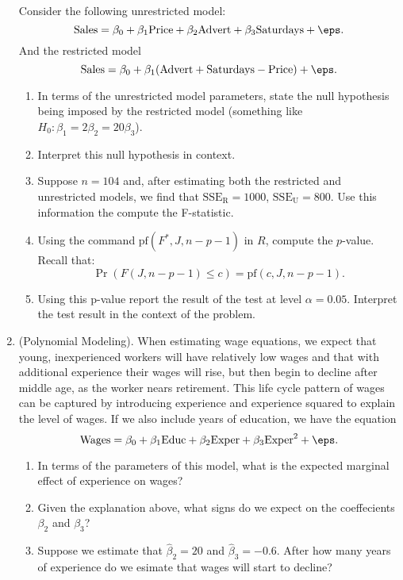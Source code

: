 \documentclass[10pt]{article}
\begin{document}
\begin{enumerate}
	Consider the following unrestricted model:
	\[
		\text{Sales} = \beta_0 + \beta_1\text{Price} + \beta_2\text{Advert} + \beta_3\text{Saturdays} + \eps 
	.\]
	And the restricted model
	\[
		\text{Sales} = \beta_0 + \beta_1(\text{Advert} + \text{Saturdays} - \text{Price}) + \eps
	.\] 
	\begin{enumerate}
		\item In terms of the unrestricted model parameters, state the null hypothesis being imposed by the restricted model (something like \(H_0: \beta_1 = 2\beta_2 = 20\beta_3\)).
		\item Interpret this null hypothesis in context.
		\item Suppose \(n=104\) and, after estimating both the restricted and unrestricted models, we find that \(\text{SSE}_\text{R} = 1000\), \(\text{SSE}_\text{U} = 800\). Use this information the compute the F-statistic.
		\item Using the command \(\text{pf}(F^*, J, n-p-1)\) in  \(R\), compute the  \(p\)-value. Recall that:
		 \[
			 \Pr\left(F(J,n-p-1) \leq c\right) = \text{pf}(c, J, n-p-1)
		.\]
		\item Using this p-value report the result of the test at level \(\alpha = 0.05\). Interpret the test result in the context of the problem.
	\end{enumerate}
	\item (Polynomial Modeling). When estimating wage equations, we expect that young, inexperienced workers will have relatively low wages and that with additional experience their wages will rise, but then begin to decline after middle age, as the worker nears retirement. This life cycle pattern of wages can be captured by introducing experience and experience squared to explain the level of wages. If we also include years of education, we have the equation
	\[
		\text{Wages} = \beta_0 + \beta_1\text{Educ} + \beta_2\text{Exper} + \beta_3\text{Exper}^2 + \eps
	.\] 
	\begin{enumerate}
		\item In terms of the parameters of this model, what is the expected marginal effect of experience on wages?
		\item Given the explanation above, what signs do we expect on the coeffecients \(\beta_2\) and  \(\beta_3\)?
		 \item Suppose we estimate that \(\hat\beta_2 = 20\) and  \(\hat\beta_3 = -0.6\). After how many years of experience do we esimate that wages will  start to decline?
	\end{enumerate}
		

\end{enumerate}
\end{document}
